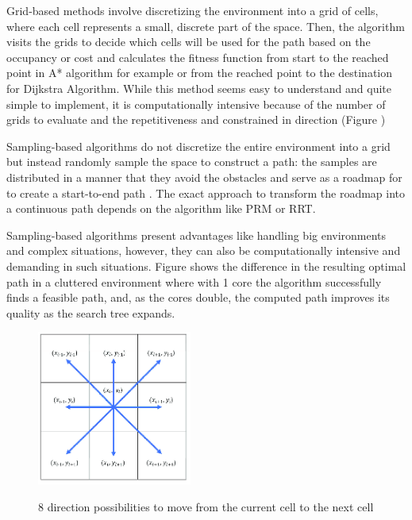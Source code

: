 Grid-based methods involve discretizing the environment into a grid of cells, where each cell represents 
a small, discrete part of the space. Then, the algorithm visits the grids to decide which cells will 
be used for the path based on the occupancy or cost and calculates the fitness function from start to 
the reached point in A* algorithm for example or from the reached point to the destination for Dijkstra 
Algorithm. While this method seems easy to understand and quite simple to implement, it is 
computationally intensive because of the number of grids to evaluate and the repetitiveness 
and constrained in direction (Figure ) 

Sampling-based algorithms do not discretize the entire environment into a grid but instead randomly sample 
the space to construct a path: the samples are distributed in a manner that they avoid the obstacles 
and serve as a roadmap for to create a start-to-end path \cite{R15}. The exact approach to transform the 
roadmap into a continuous path depends on the algorithm like PRM or RRT. 

Sampling-based algorithms present advantages like handling big environments and complex situations, 
however, they can also be computationally intensive and demanding in such situations. 
Figure  shows the difference in the resulting optimal path in a cluttered environment where with 
1 core the algorithm successfully finds a feasible path, and, as the cores double, the computed path 
improves its quality as the search tree expands.  

\begin{figure}[H]
    \begin{center}
       \includegraphics[width=2in]{images/Chap1/8dirs_pathPlan.png}\\
       \caption{8 direction possibilities to move from the current cell to the next cell \cite{R14}}
       \label{direction possibilities}
       \end{center}
\end{figure}

